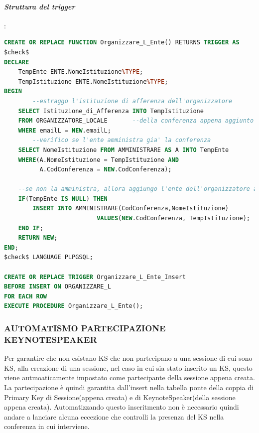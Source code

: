 \documentclass[a4page]{article}
\begin{document}
\paragraph{\textit{Struttura del trigger}}:	
\begin{lstlisting}[language=SQL,
        deletekeywords={IDENTITY,INT},
        morekeywords={clustered},    
        framesep=10pt,
        framextopmargin=10pt]
CREATE OR REPLACE FUNCTION Organizzare_L_Ente() RETURNS TRIGGER AS
$check$
DECLARE 
	TempEnte ENTE.NomeIstituzione%TYPE;
	TempIstituzione ENTE.NomeIstituzione%TYPE;
BEGIN
        --estraggo l'istituzione di afferenza dell'organizzatore
	SELECT Istituzione_di_Afferenza INTO TempIstituzione	
	FROM ORGANIZZATORE_LOCALE	    --della conferenza appena aggiunto							
	WHERE emailL = NEW.emailL;
        --verifico se l'ente amministra gia' la conferenza
	SELECT NomeIstituzione FROM AMMINISTRARE AS A INTO TempEnte		
	WHERE(A.NomeIstituzione = TempIstituzione AND
		  A.CodConferenza = NEW.CodConferenza);

	--se non la amministra, allora aggiungo l'ente dell'organizzatore a quelli che amministrano la conferenza
	IF(TempEnte IS NULL) THEN		
		INSERT INTO AMMINISTRARE(CodConferenza,NomeIstituzione)
						  VALUES(NEW.CodConferenza, TempIstituzione);
	END IF;
	RETURN NEW;
END;
$check$ LANGUAGE PLPGSQL;

CREATE OR REPLACE TRIGGER Organizzare_L_Ente_Insert
BEFORE INSERT ON ORGANIZZARE_L
FOR EACH ROW
EXECUTE PROCEDURE Organizzare_L_Ente();        
\end{lstlisting}
\newpage
\subsubsection{AUTOMATISMO PARTECIPAZIONE KEYNOTESPEAKER}
Per garantire che non esistano KS che non partecipano a una sessione di cui sono KS, alla creazione di una sessione, nel caso in cui sia stato inserito un KS, questo viene autmoaticamente impostato come partecipante della sessione appena creata. La partecipazione è quindi garantita dall'insert nella tabella ponte della coppia di Primary Key di Sessione(appena creata) e di KeynoteSpeaker(della sessione appena creata). Automatizzando questo inseritmento non è necessario quindi andare a lanciare alcuna eccezione che controlli la presenza del KS nella conferenza in cui interviene.
\vspace{1cm}
\end{document}
